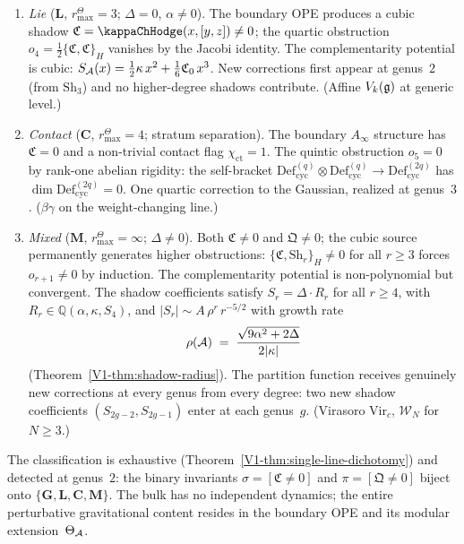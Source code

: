 \begin{theorem}
\begin{enumerate}[label=\textup{(\roman*)}]
\item \emph{Lie} ($\mathbf{L}$, \(r^\Theta_{\max}=3\);
 $\Delta = 0$, $\alpha \neq 0$).
 The boundary OPE produces a cubic shadow
 $\mathfrak{C} = \kappaChHodge(x,[y,z]) \neq 0$;
 the quartic obstruction $o_4 =
 \tfrac{1}{2}\{\mathfrak{C},\mathfrak{C}\}_H$ vanishes
 by the Jacobi identity.
 The complementarity potential is cubic:
 $S_{\mathcal{A}}(x) = \tfrac{1}{2}\kappa\,x^2 +
 \tfrac{1}{6}\mathfrak{C}_0\,x^3$.
 New corrections first appear at genus~$2$
 \textup{(}from $\mathrm{Sh}_3$\textup{)} and no
 higher-degree shadows contribute.
 \textup{(}Affine $V_k(\mathfrak{g})$ at generic level.\textup{)}

\item \emph{Contact} ($\mathbf{C}$, \(r^\Theta_{\max}=4\);
 stratum separation\textup{)}.
The boundary $A_\infty$ structure has
$\mathfrak{C} = 0$ and a non-trivial contact flag
$\chi_{\mathrm{ct}} = 1$.
 The quintic obstruction $o_5 = 0$ by rank-one abelian
 rigidity: the self-bracket
 $\mathrm{Def}_{\mathrm{cyc}}^{(q)} \otimes
 \mathrm{Def}_{\mathrm{cyc}}^{(q)} \to
 \mathrm{Def}_{\mathrm{cyc}}^{(2q)}$ has
 $\dim\mathrm{Def}_{\mathrm{cyc}}^{(2q)} = 0$.
 One quartic correction to the Gaussian, realized at
 genus~$3$.
 \textup{(}$\beta\gamma$ on the weight-changing line.\textup{)}

\item \emph{Mixed} ($\mathbf{M}$, \(r^\Theta_{\max}=\infty\);
 $\Delta \neq 0$).
 Both $\mathfrak{C} \neq 0$ and $\mathfrak{Q} \neq 0$;
 the cubic source permanently generates higher obstructions:
 $\{\mathfrak{C}, \mathrm{Sh}_r\}_H \neq 0$ for all
 $r \geq 3$ forces $o_{r+1} \neq 0$ by induction.
 The complementarity potential is non-polynomial but
 convergent. The shadow coefficients satisfy
 $S_r = \Delta \cdot R_r$ for all $r \geq 4$, with
 $R_r \in \mathbb{Q}(\alpha, \kappa, S_4)$, and
 $|S_r| \sim A\,\rho^r\,r^{-5/2}$ with growth rate
 \[
 \rho(\mathcal{A})
 \;=\;
 \frac{\sqrt{9\alpha^2 + 2\Delta}}{2|\kappa|}
 \]
 \textup{(}Theorem~\textup{\ref*{V1-thm:shadow-radius}}\textup{)}.
 The partition function receives genuinely new corrections
 at every genus from every degree: two new shadow
 coefficients $(S_{2g-2}, S_{2g-1})$ enter at each genus~$g$.
 \textup{(}Virasoro $\mathrm{Vir}_c$, $\mathcal{W}_N$ for
 $N \geq 3$.\textup{)}
\end{enumerate}
The classification is exhaustive
\textup{(}Theorem~\textup{\ref*{V1-thm:single-line-dichotomy}}\textup{)}
and detected at genus~$2$: the binary invariants
$\sigma = [\mathfrak{C} \neq 0]$ and
$\pi = [\mathfrak{Q} \neq 0]$ biject onto
$\{\mathbf{G}, \mathbf{L}, \mathbf{C}, \mathbf{M}\}$.
The bulk has no independent dynamics; the entire perturbative
gravitational content resides in the boundary OPE and its
modular extension~$\Theta_{\mathcal{A}}$.
\end{theorem}

